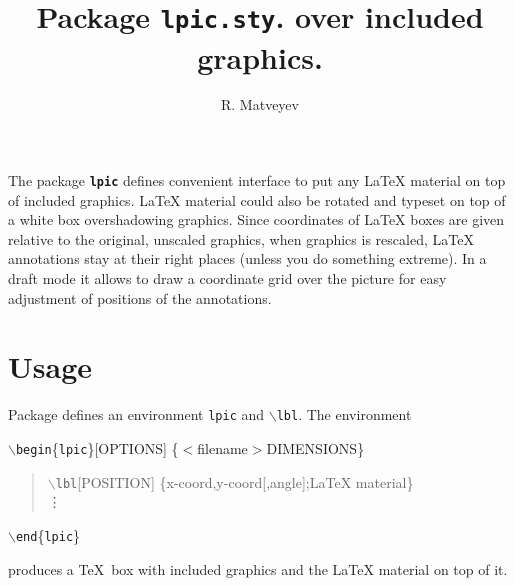 \documentclass[10pt]{amsart}
\title{Package \texttt{lpic.sty}. \latex{} over included graphics.}
\author{R. Matveyev}
\def\cmd#1{\texttt{$\backslash$#1}}
\let\tex=\TeX
\let\latex=\LaTeX
\begin{document}
\maketitle

The package \textbf{\texttt{lpic}} defines convenient interface to put any
\latex{} material on top of included graphics. 
\latex{} material could also be rotated and typeset on top of a white
box overshadowing graphics. Since coordinates of \latex{} boxes are
given relative to the original, unscaled graphics, when graphics is
rescaled, \latex{} annotations stay at their right places (unless you
do something extreme). In a draft mode it allows to draw a coordinate
grid over the picture for easy adjustment of positions of the annotations.

\section{Usage}

Package  defines an environment \texttt{lpic} and \cmd{lbl}.
The environment \vspace{2mm}\par\noindent
\cmd{begin}\{\texttt{lpic}\}[{\sc OPTIONS}]
   \{$<${\sc filename}$>${\sc DIMENSIONS}\}
   \begin{quote}
     \cmd{lbl}[{\sc POSITION}]
     \{{\sc x-coord,y-coord[,angle];\latex{} material}\}\\
     \vdots
   \end{quote}
   \cmd{end}\{\texttt{lpic}\} \vspace{2mm}\par\noindent
produces a \tex\ box with included graphics and the \latex{} material on
top of it.
\end{document}
